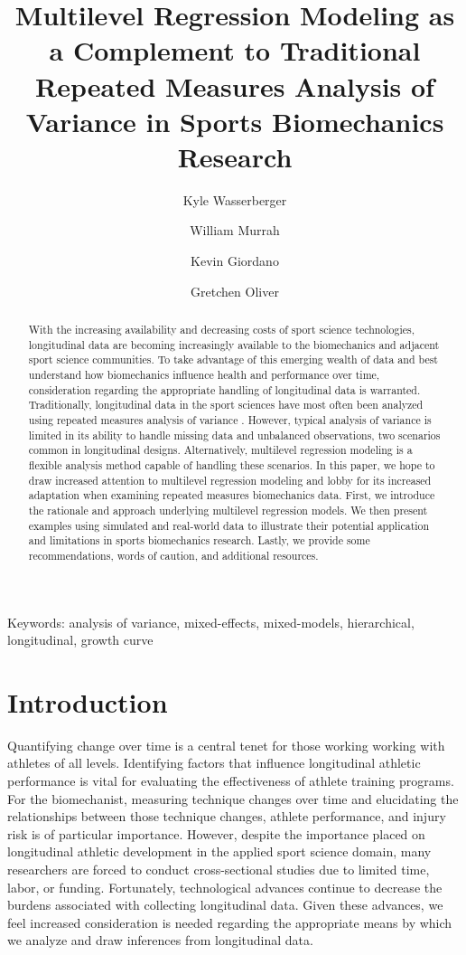 \documentclass[
]{article}
\title{Multilevel Regression Modeling as a Complement to Traditional Repeated Measures Analysis of Variance in Sports Biomechanics Research}
\date{\vspace{-2.5em}}
\author[1,2]{\footnotesize Kyle Wasserberger}
\author[3]{\footnotesize William Murrah}
\author[4]{\footnotesize Kevin Giordano}
\author[2]{\footnotesize Gretchen Oliver}
\affil[1]{Research \& Development; Driveline Baseball}
\affil[2]{School of Kinesiology; Auburn University}
\affil[3]{\footnotesize Department of Educational Foundations, Leadership, \& Technology; Auburn University}
\affil[4]{\footnotesize Department of Physical Therapy; Creighton University}
\begin{document}
\maketitle

\begin{center}
Keywords: analysis of variance, mixed-effects, mixed-models, hierarchical, longitudinal, growth curve
\end{center}

\newpage
\linenumbers
\begin{abstract}
\doublespacing
With the increasing availability and decreasing costs of sport science technologies, longitudinal data are becoming increasingly available to the biomechanics and adjacent sport science communities. To take advantage of this emerging wealth of data and best understand how biomechanics influence health and performance over time, consideration regarding the appropriate handling of longitudinal data is warranted. Traditionally, longitudinal data in the sport sciences have most often been analyzed using repeated measures analysis of variance . However, typical analysis of variance is limited in its ability to handle missing data and unbalanced observations, two scenarios common in longitudinal designs. Alternatively, multilevel regression modeling is a flexible analysis method capable of handling these scenarios. In this paper, we hope to draw increased attention to multilevel regression modeling and lobby for its increased adaptation when examining repeated measures biomechanics data. First, we introduce the rationale and approach underlying multilevel regression models. We then present examples using simulated and real-world data to illustrate their potential application and limitations in sports biomechanics research. Lastly, we provide some recommendations, words of caution, and additional resources.
\end{abstract}

\newpage
{}

\hypertarget{introduction}{%
\section{Introduction}\label{introduction}}

\doublespacing

Quantifying change over time is a central tenet for those working working with athletes of all levels. Identifying factors that influence longitudinal athletic performance is vital for evaluating the effectiveness of athlete training programs. For the biomechanist, measuring technique changes over time and elucidating the relationships between those technique changes, athlete performance, and injury risk is of particular importance. However, despite the importance placed on longitudinal athletic development in the applied sport science domain, many researchers are forced to conduct cross-sectional studies due to limited time, labor, or funding. Fortunately, technological advances continue to decrease the burdens associated with collecting longitudinal data. Given these advances, we feel increased consideration is needed regarding the appropriate means by which we analyze and draw inferences from longitudinal data.
\end{document}
